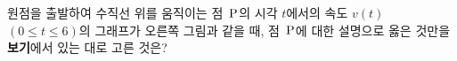 \noindent\begin{minipage}[t]{0.58\linewidth}\vspace{0pt}\raggedright 원점을 출발하여 수직선 위를 움직이는 점~$\mathrm{P}$의 시각 $t$에서의 속도 $v(t)$ $(0\le t\le 6)$의 그래프가 오른쪽 그림과 같을 때, 점~$\mathrm{P}$에 대한 설명으로 옳은 것만을 \textbf{보기}에서 있는 대로 고른 것은? \end{minipage}\hfill\begin{minipage}[t]{0.4\linewidth}\vspace{0pt}\centering \resizebox{\ifdim\width>\linewidth\linewidth\else\width\fi}{!}{}\end{minipage}\par
\noindent {}

